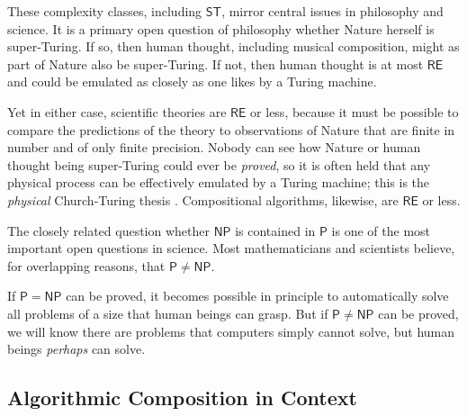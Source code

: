 \documentclass[11pt,papersize=a4]{scrartcl}
\begin{document}
\noindent These complexity classes, including $\mathsf{ST}$, mirror central issues in philosophy and science. It is a primary open question of philosophy whether Nature herself is super-Turing. If so, then human thought, including musical composition, might as part of Nature also be super-Turing. If not, then human thought is at most $\mathsf{RE}$ and could be emulated as closely as one likes by a Turing machine. 

Yet in either case, scientific theories are $\mathsf{RE}$ or less, because it must be possible to compare the predictions of the theory to observations of Nature that are finite in number and of only finite precision. Nobody can see how Nature or human thought being super-Turing could ever be \emph{proved}, so it is often held that any physical process can be effectively emulated by a Turing machine; this is the \emph{physical} Church-Turing thesis \parencite{aaronson2005npcomplete, sep-church-turing}. Compositional algorithms, likewise, are $\mathsf{RE}$ or less.

The closely related question whether $\mathsf{NP}$ is contained in $\mathsf{P}$ is one of the most important open questions in science. Most mathematicians and scientists believe, for overlapping reasons, that $\mathsf{P} \ne \mathsf{NP}$.

If $\mathsf{P} = \mathsf{NP}$  can be proved, it becomes possible in principle to automatically solve all problems of a size that human beings can grasp. But if $\mathsf{P} \ne \mathsf{NP}$ can be proved, we will know there are problems that computers simply cannot solve, but human beings \emph{perhaps} can solve. 
 
\subsection*{Algorithmic Composition in Context}
\end{document}
